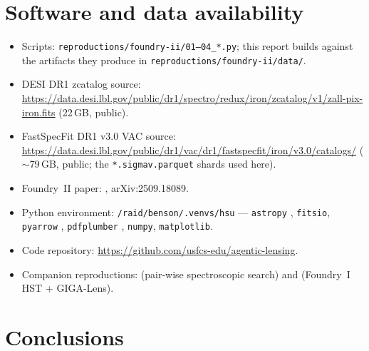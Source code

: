 \documentclass[11pt,letterpaper]{article}
\begin{document}
\section{Software and data availability}

\begin{itemize}
\item Scripts: \texttt{reproductions/foundry-ii/01--04\_*.py}; this report
      builds against the artifacts they produce in
      \texttt{reproductions/foundry-ii/data/}.
\item DESI DR1 zcatalog source:
      \url{https://data.desi.lbl.gov/public/dr1/spectro/redux/iron/zcatalog/v1/zall-pix-iron.fits}
      (22\,GB, public).
\item FastSpecFit DR1 v3.0 VAC source:
      \url{https://data.desi.lbl.gov/public/dr1/vac/dr1/fastspecfit/iron/v3.0/catalogs/}
      ($\sim$79\,GB, public; the \texttt{*.sigmav.parquet} shards used here).
\item Foundry~II paper: \citet{huang2025foundry2}, arXiv:2509.18089.
\item Python environment: \texttt{/raid/benson/.venvs/hsu} ---
      \texttt{astropy} \autocite{astropy2022}, \texttt{fitsio},
      \texttt{pyarrow} \autocite{pyarrow}, \texttt{pdfplumber}
      \autocite{pdfplumber}, \texttt{numpy}, \texttt{matplotlib}.
\item Code repository: \url{https://github.com/usfcs-edu/agentic-lensing}.
\item Companion reproductions: \citet{hsu2025pairwise} (pair-wise spectroscopic
      search) and \citet{huang2025foundry1} (Foundry~I HST + GIGA-Lens).
\end{itemize}


\section{Conclusions}
\end{document}
